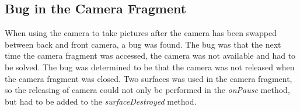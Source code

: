 \subsection*{Bug in the Camera Fragment}
When using the camera to take pictures after the camera has been swapped between back and front camera, a bug was found.
The bug was that the next time the camera fragment was accessed, the camera was not available and had to be solved.
The bug was determined to be that the camera was not released when the camera fragment was closed.
Two surfaces was used in the camera fragment, so the releasing of camera could not only be performed in the \textit{onPause} method, but had to be added to the \textit{surfaceDestroyed} method.